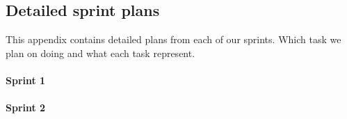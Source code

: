


\subsection{Detailed sprint plans}
This appendix contains detailed plans from each of our sprints. Which task we plan on doing and what each task represent.

\paragraph{Sprint 1}



\paragraph{Sprint 2}


